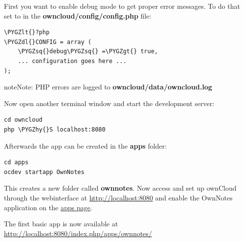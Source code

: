 \documentclass[letterpaper,10pt,english]{sphinxmanual}
\def\PYGZlt{\char`\<}
\def\PYGZgt{\char`\>}
\def\PYGZdl{\char`\$}
\def\PYGZhy{\char`\-}
\def\PYGZsq{\char`\'}
\begin{document}
First you want to enable debug mode to get proper error messages. To do that set  to  in the \textbf{owncloud/config/config.php} file:

\begin{Verbatim}[commandchars=\\\{\}]
\PYGZlt{}?php
\PYGZdl{}CONFIG = array (
    \PYGZsq{}debug\PYGZsq{} =\PYGZgt{} true,
    ... configuration goes here ...
);
\end{Verbatim}

\begin{notice}{note}{Note:}
PHP errors are logged to \textbf{owncloud/data/owncloud.log}
\end{notice}

Now open another terminal window and start the development server:

\begin{Verbatim}[commandchars=\\\{\}]
cd owncloud
php \PYGZhy{}S localhost:8080
\end{Verbatim}

Afterwards the app can be created in the \textbf{apps} folder:

\begin{Verbatim}[commandchars=\\\{\}]
cd apps
ocdev startapp OwnNotes
\end{Verbatim}

This creates a new folder called \textbf{ownnotes}. Now access and set up ownCloud through the webinterface at \href{http://localhost:8080}{http://localhost:8080} and enable the OwnNotes application on the \href{http://localhost:8080/index.php/settings/apps}{apps page}.

The first basic app is now available at \href{http://localhost:8080/index.php/apps/ownnotes/}{http://localhost:8080/index.php/apps/ownnotes/}
\end{document}
